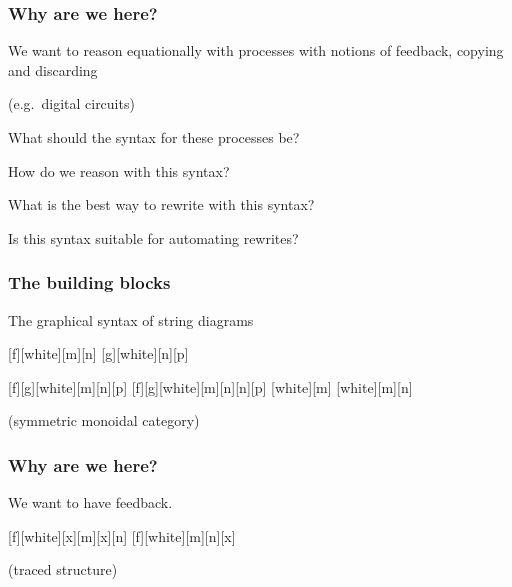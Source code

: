 \begin{frame}
    \frametitle{Why are we here?}

    \centering
    \LARGE

    We want to reason \alert{equationally} with \alert{processes} with notions of
    \alert{feedback}, \alert{copying} and \alert{discarding}

    \normalsize
    (e.g.\ \alert{digital circuits})

    \large
    \pause

    \vspace{1em}

    What should the \alert{syntax} for these processes be?

    \pause

    How do we \alert{reason} with this syntax?

    \pause

    What is the best way to \alert{rewrite} with this syntax?

    \pause

    Is this syntax suitable for \alert{automating} rewrites?

\end{frame}
\begin{frame}
    \frametitle{The building blocks}

    \centering

    \pause
    \LARGE
    The graphical syntax of \alert{string diagrams}

    \pause
    \normalsize
    \vspace{2em}

    [f][white][m][n]
    [g][white][n][p]

    \pause
    \vspace{2em}

    [f][g][white][m][n][p]
    [f][g][white][m][n][n][p]
    \pause
    [white][m]
    [white][m][n]

    \normalsize
    \vspace{1em}

    (\alert{symmetric monoidal category})

\end{frame}

\begin{frame}
    \frametitle{Why are we here?}

    \centering
    \LARGE
    We want to have \alert{feedback}.

    \pause
    \normalsize
    \vspace{2em}

    [f][white][x][m][x][n]
    \quad
    \pause
    \scalebox{2}{\(\Rightarrow\)}
    \quad
    [f][white][m][n][x]

    \pause
    \vspace{1em}
    (traced structure)

\end{frame}

